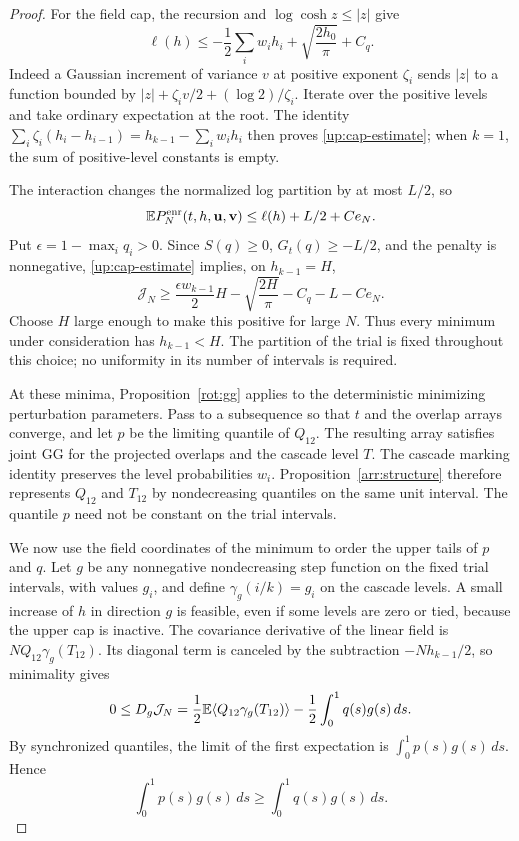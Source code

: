 \begin{proof}
For the field cap, the recursion and \(\log\cosh z\le|z|\) give
\begin{equation}\label{up:cap-estimate}
 \ell(h)\le
 -\frac12\sum_iw_i h_i+\sqrt{\frac{2h_0}{\pi}}+C_q.
\end{equation}
Indeed a Gaussian increment of variance \(v\) at positive exponent
\(\zeta_i\) sends \(|z|\) to a function bounded by
\(|z|+\zeta_i v/2+(\log2)/\zeta_i\). Iterate over the positive
levels and take ordinary expectation at the root. The identity
\(\sum_i\zeta_i(h_i-h_{i-1})=h_{k-1}-\sum_iw_i h_i\)
then proves \eqref{up:cap-estimate}; when \(k=1\), the sum of
positive-level constants is empty.

The interaction changes the normalized log partition by at most
\(L/2\), so
\[
 \mathbb E P_N^{\mathrm{enr}}(t,h,\mathbf u,\mathbf v)
 \le\ell(h)+L/2+Ce_N.
\]
Put \(\epsilon=1-\max_iq_i>0\). Since \(S(q)\ge0\),
\(G_t(q)\ge-L/2\), and the penalty is nonnegative,
\eqref{up:cap-estimate} implies, on \(h_{k-1}=H\),
\[
 \mathcal J_N
 \ge\frac{\epsilon w_{k-1}}2H
       -\sqrt{\frac{2H}{\pi}}-C_q-L-Ce_N.
\]
Choose \(H\) large enough to make this positive for large \(N\).
Thus every minimum under consideration has \(h_{k-1}<H\).
The partition of the trial is fixed throughout this choice; no
uniformity in its number of intervals is required.

At these minima, Proposition~\ref{rot:gg} applies to the deterministic
minimizing perturbation parameters. Pass to a subsequence so that
\(t\) and the overlap arrays converge, and let \(p\)
be the limiting quantile of \(Q_{12}\). The resulting array satisfies
joint GG for the projected overlaps and the cascade level \(T\).
The cascade marking identity preserves the level probabilities
\(w_i\). Proposition~\ref{arr:structure} therefore represents
\(Q_{12}\) and \(T_{12}\) by nondecreasing quantiles on the same
unit interval. The quantile \(p\) need not be constant on the trial
intervals.

We now use the field coordinates of the minimum to order the upper
tails of \(p\) and \(q\). Let \(g\) be any nonnegative
nondecreasing step function on the fixed trial intervals, with values
\(g_i\), and define \(\gamma_g(i/k)=g_i\) on the cascade levels.
A small
increase of \(h\) in direction \(g\) is feasible, even if some
levels are zero or tied, because the upper cap is inactive. The
covariance derivative of the linear field is
\(NQ_{12}\gamma_g(T_{12})\). Its diagonal term is canceled by the
subtraction \(-Nh_{k-1}/2\), so minimality gives
\[
 0\le D_g\mathcal J_N
 =\frac12\mathbb E\langle Q_{12}\gamma_g(T_{12})\rangle
  -\frac12\int_0^1q(s)g(s)\,ds.
\]
By synchronized quantiles, the limit of the first expectation is
\(\int_0^1p(s)g(s)\,ds\). Hence
\begin{equation}\label{up:contact-order}
 \int_0^1p(s)g(s)\,ds\ge\int_0^1q(s)g(s)\,ds.
\end{equation}


\end{proof}
